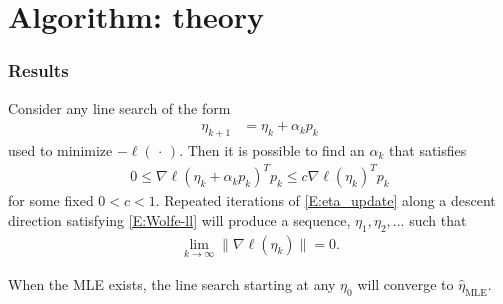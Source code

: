 \documentclass[ 10pt]{beamer}
\newcommand{\fatdot}{\,\cdot\,}
\newcommand{\etaMLE}{\hat{\eta}_{\textrm{MLE}}}
\begin{document}
\section{Algorithm: theory}

\frame
{
\frametitle{Results}
{\small

\begin{theorem} \label{Thm:log like max}
Consider any line search of the form 
\begin{align}
	\eta_{k+1} &= \eta_k + \alpha_k p_k \label{E:eta_update}
\end{align}
used to minimize $-\ell(\fatdot)$. %
Then it is possible to find an $\alpha_k$ that satisfies %
\begin{align}
	0 \leq \nabla \ell( \eta_k + \alpha_k p_k)^T p_k  \leq c \nabla \ell(\eta_k)^T p_k  
\label{E:Wolfe-ll}
\end{align}
for some fixed $0 < c < 1$.
Repeated iterations of \eqref{E:eta_update} along a descent direction 
satisfying \eqref{E:Wolfe-ll} will produce a sequence, $\eta_1, \eta_2, \ldots$ such 
that
\begin{align*}
	\lim_{k \to \infty} \lVert \nabla \ell(\eta_k) \rVert = 0.
\end{align*}
\end{theorem}
\vspace{2mm}

\begin{theorem} \label{Thm:Line Search works}
When the MLE exists, the 
line search starting at any $\eta_0$ will converge to $\etaMLE$.
\end{theorem}
}

}
%
%
%
%
%
\end{document}
